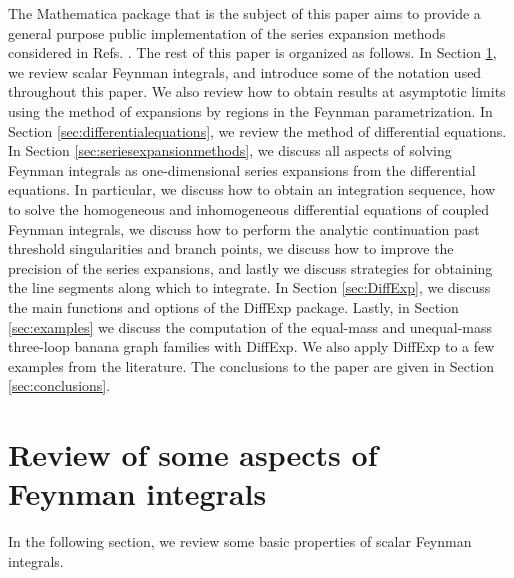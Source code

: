 \documentclass{article}
\begin{document}
The Mathematica package that is the subject of this paper aims to provide a general purpose public implementation of the series expansion methods considered in Refs. \cite{Francesco:2019yqt, Bonciani:2019jyb, Frellesvig:2019byn, Abreu:2020jxa}. The rest of this paper is organized as follows. In Section \ref{sec:feynmanintegralreview}, we review scalar Feynman integrals, and introduce some of the notation used throughout this paper. We also review how to obtain results at asymptotic limits using the method of expansions by regions in the Feynman parametrization. In Section \ref{sec:differentialequations}, we review the method of differential equations. In Section \ref{sec:seriesexpansionmethods}, we discuss all aspects of solving Feynman integrals as one-dimensional series expansions from the differential equations. In particular, we discuss how to obtain an integration sequence, how to solve the homogeneous and inhomogeneous differential equations of coupled Feynman integrals, we discuss how to perform the analytic continuation past threshold singularities and branch points, we discuss how to improve the precision of the series expansions, and lastly we discuss strategies for obtaining the line segments along which to integrate. In Section \ref{sec:DiffExp}, we discuss the main functions and options of the DiffExp package. Lastly, in Section \ref{sec:examples} we discuss the computation of the equal-mass and unequal-mass three-loop banana graph families with DiffExp. We also apply DiffExp to a few examples from the literature. The conclusions to the paper are given in Section \ref{sec:conclusions}.

\section{Review of some aspects of Feynman integrals}
\label{sec:feynmanintegralreview}
In the following section, we review some basic properties of scalar Feynman integrals.
\end{document}
